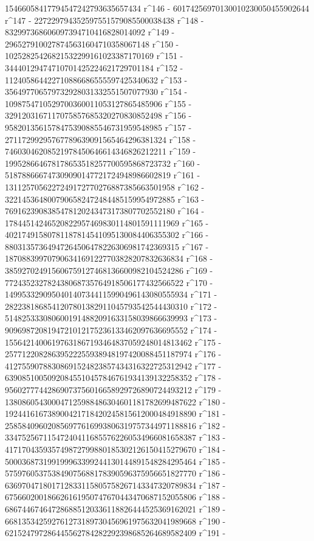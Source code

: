        15466058417794547242793635657434 r^146 - 
       60174256970130010230050455902644 r^147 - 
       227229794352597551579085500038438 r^148 - 
       832997368606097394710416828014092 r^149 - 
       2965279100278745631604710358067148 r^150 - 
       10252825426821532299161023387170169 r^151 - 
       34440129474710701425224621729701184 r^152 - 
       112405864422710886686555597425340632 r^153 - 
       356497706579732928031332551507077930 r^154 - 
       1098754710529700360011053127865485906 r^155 - 
       3291203167117075857685320270830852498 r^156 - 
       9582013561578475390885546731959548985 r^157 - 
       27117299295767789639091565464296381324 r^158 - 
       74603046208521978450646614346826212211 r^159 - 
       199528664678178653518257700595868723732 r^160 - 
       518788666747309090147721724948986602819 r^161 - 
       1311257056227249172770276887385663501958 r^162 - 
       3221453648007906582472484485159954972885 r^163 - 
       7691623908385478120243473173807702552180 r^164 - 
       17844514246520822957469830114801591111969 r^165 - 
       40217491580781187814541095130084406355302 r^166 - 
       88031357364947264506478226306981742369315 r^167 - 
       187088399707906341691227703828207832636834 r^168 - 
       385927024915606759127468136600982104524286 r^169 - 
       772435232782438068735764918506177432566522 r^170 - 
       1499533290950401407344115990496143080555934 r^171 - 
       2822381868541207801382911045793542544430310 r^172 - 
       5148253330806001914882091633158039866639993 r^173 - 
       9096987208194721012175236133462097636695552 r^174 - 
       15564214006197631867193464837059248014813462 r^175 - 
       25771220828639522255938948197420088451187974 r^176 - 
       41275590788308691524823857434316322725312942 r^177 - 
       63908510050920845510457846761934139132258352 r^178 - 
       95602777442869073756016658929726890724493212 r^179 - 
       138086054300047125988486304601181782699487622 r^180 - 
       192441616738900421718420245815612000484918890 r^181 - 
       258584096020856977616993806319757344971188816 r^182 - 
       334752567115472404116855762260534966081658387 r^183 - 
       417170435935749872799880185302126150415279670 r^184 - 
       500036873199199963399244130144891548284295464 r^185 - 
       575976053753849075688178390596375956651827770 r^186 - 
       636970471801712833115805758267143347320789834 r^187 - 
       675660200186626161950747670443470687152055806 r^188 - 
       686744674647286885120336118826444525369162021 r^189 - 
       668135342592761273189730456961975632041989668 r^190 - 
       621524797286445562784282292398685264689582409 r^191 - 
